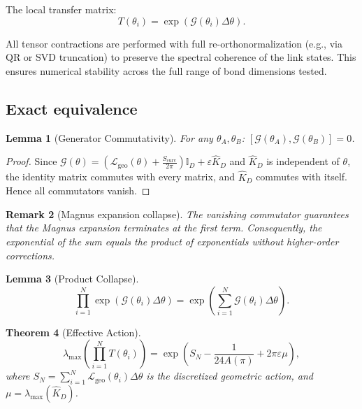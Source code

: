 \documentclass[12pt]{article}
\numberwithin{equation}{section}
\newtheorem{theorem}{Theorem}[section]
\newtheorem{lemma}[theorem]{Lemma}
\newtheorem{remark}[theorem]{Remark}
\begin{document}
The local transfer matrix:
\begin{equation}\label{eq:transfer_local}
T(\theta_i) = \exp\left(\mathcal{G}(\theta_i) \Delta\theta\right).
\end{equation}

All tensor contractions are performed with full re-orthonormalization (e.g., via QR or SVD truncation) to preserve the spectral coherence of the link states. This ensures numerical stability across the full range of bond dimensions tested.

\subsection{Exact equivalence}

\begin{lemma}[Generator Commutativity]\label{lem:commute}
For any \(\theta_A, \theta_B\): \([\mathcal{G}(\theta_A), \mathcal{G}(\theta_B)] = 0\).
\end{lemma}

\begin{proof}
Since \(\mathcal{G}(\theta) = \left(\mathcal{L}_{\text{geo}}(\theta) + \frac{S_{\text{curv}}}{2\pi}\right) \mathbb{I}_D + \varepsilon \widehat{K}_D\) and \(\widehat{K}_D\) is independent of \(\theta\), the identity matrix commutes with every matrix, and \(\widehat{K}_D\) commutes with itself. Hence all commutators vanish.
\end{proof}

\begin{remark}[Magnus expansion collapse]
The vanishing commutator guarantees that the Magnus expansion \cite{magnus1954} terminates at the first term. Consequently, the exponential of the sum equals the product of exponentials without higher-order corrections.
\end{remark}

\begin{lemma}[Product Collapse]\label{lem:collapse}
\[
\prod_{i=1}^{N} \exp\left(\mathcal{G}(\theta_i) \Delta\theta\right) = \exp\left(\sum_{i=1}^{N} \mathcal{G}(\theta_i) \Delta\theta\right).
\]
\end{lemma}

\begin{theorem}[Effective Action]\label{thm:effective}
\[
\lambda_{\max}\left(\prod_{i=1}^{N} T(\theta_i)\right) = \exp\left(S_N - \frac{1}{24A(\pi)} + 2\pi \varepsilon \mu\right),
\]
where \(S_N = \sum_{i=1}^N \mathcal{L}_{\text{geo}}(\theta_i) \Delta\theta\) is the discretized geometric action, and \(\mu = \lambda_{\max}(\widehat{K}_D)\).
\end{theorem}
\end{document}
